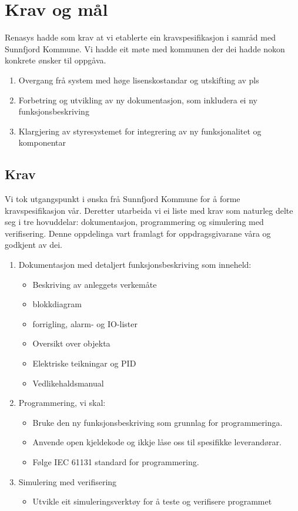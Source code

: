 \chapter{Krav og mål}
\thispagestyle{fancy}
\gls{Renasys} hadde som krav at vi etablerte ein kravspesifikasjon i samråd med \gls{Sunnfjord Kommune}.
Vi hadde eit møte med kommunen der dei hadde nokon konkrete ønsker til oppgåva.

\begin{enumerate}
    \item Overgang frå system med høge lisenskostandar og utskifting av pls
    \item Forbetring og utvikling av ny dokumentasjon, som inkludera ei ny funksjonsbeskriving 
    \item Klargjering av styresystemet for integrering av ny funksjonalitet og komponentar
\end{enumerate}

\section{Krav}
Vi tok utgangspunkt i ønska frå \gls{Sunnfjord Kommune} for å forme kravspesifikasjon vår.
Deretter utarbeida vi ei liste med krav som naturleg delte seg i tre
hovuddelar: dokumentasjon, programmering og simulering med verifisering. Denne oppdelinga vart framlagt for oppdragsgivarane våra og godkjent av dei. 



\begin{enumerate}
    \item Dokumentasjon med detaljert funksjonsbeskriving som inneheld:
        \begin{itemize} 
        \item Beskriving av anleggets verkemåte
        \item \gls{blokkdiagram}
        \item \gls{forrigling}, alarm- og \gls{IO}-lister
        \item Oversikt over objekta
        \item Elektriske teikningar og \gls{PID}
        \item Vedlikehaldsmanual
        \end{itemize}
    \item Programmering, vi skal:
        \begin{itemize}
        \item Bruke den ny funksjonsbeskriving som grunnlag for programmeringa.
        \item Anvende open kjeldekode og ikkje låse oss til spesifikke leverandørar.
        \item Følge \gls{IEC} 61131 standard for programmering.
        \end{itemize}
    \item Simulering med verifisering
        \begin{itemize}
        \item Utvikle eit simuleringsverktøy for å teste og verifisere programmet
        \end{itemize}
\end{enumerate}

